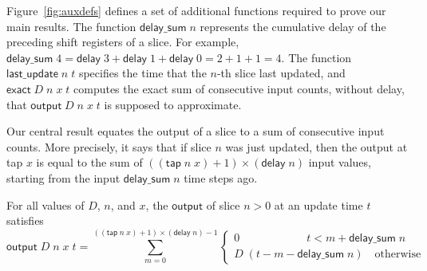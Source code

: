 \documentclass{llncs}
\begin{document}
Figure~\ref{fig:auxdefs} defines a set of additional functions required to prove our main results.
The function $\mathsf{delay\_sum}\;n$ represents the cumulative delay of the preceding shift registers of a slice.
For example, $\mathsf{delay\_sum}\;4 = \mathsf{delay}\;3 + \mathsf{delay}\;1 + \mathsf{delay}\;0 = 2 +1 +1 = 4$.
The function $\mathsf{last\_update}\;n\;t$ specifies the time that the $n$-th slice last updated, and $\mathsf{exact}\;D\;n\;x\;t$ computes the exact sum of consecutive input counts, without delay, that $\mathsf{output}\;D\;n\;x\;t$ is supposed to approximate.


Our central result equates the output of a slice to a sum of consecutive input counts.
More precisely, it says that if slice $n$ was just updated, then the output at tap $x$ is equal to the sum of $((\mathsf{tap}\;n\;x)+1)\times(\mathsf{delay}\;n)$ input values, starting from the input $\mathsf{delay\_sum}\;n$ time steps ago.

\begin{theorem}\label{output_input_at_update_times}
For all values of $D$, $n$, and $x$, the $\mathsf{output}$ of slice $n>0$ at an update time $t$ satisfies
\begin{equation*}
\mathsf{output}\;D\;n\;x\;t=\sum_{m=0}^{((\mathsf{tap}\;n\;x)+1)\times(\mathsf{delay}\;n)-1}\begin{cases}0 \qquad\qquad\qquad  t<m+\mathsf{delay\_sum}\;n\\D\;(t-m-\mathsf{delay\_sum}\;n)\quad\text{otherwise}\end{cases}
\end{equation*}
\end{theorem}
\end{document}
